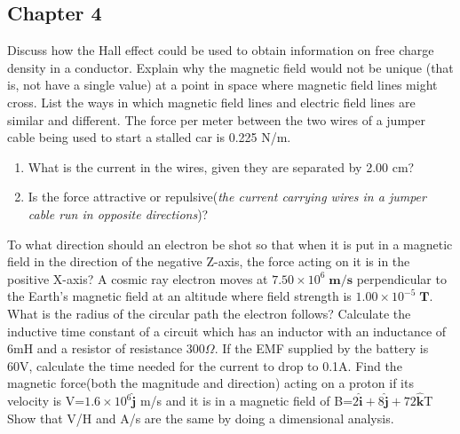 \documentclass[12pt,addpoints]{exam}
\begin{document}
\begin{questions}
		\subsection*{Chapter 4}
		\question Discuss how the Hall effect could be used to obtain information on free charge density in a conductor.\vspace{1.5in}
		\question Explain why the magnetic field would not be unique (that is, not have a single value) at a point in space where magnetic field lines might cross. \vspace{1.5in}
		\question List the ways in which magnetic field lines and electric field lines are similar and different.\vspace{1.5in}
		\question The force per meter between the two wires of a jumper cable being used to start a stalled car is 0.225 N/m. 
		\begin{enumerate}[label=(\roman*)]
			\item What is the current in the wires, given they are separated by 2.00 cm?\vspace{1.5in}
			\item Is the force attractive or repulsive(\textit{the current carrying wires in a jumper cable run in opposite directions})?\vspace{1.5in}
		\end{enumerate}
		\question To what direction should an electron be shot so that when it is put in a magnetic field in the direction of the negative Z-axis, the force acting on it is in the positive X-axis?\vspace{1.5in}
		\question A cosmic ray electron moves at $ 7.50 \times 10^6 \;\textbf{m/s}$ perpendicular to the Earth’s magnetic field at an altitude where field strength is $1.00 \times 10^{-5} \;\textbf{T} $. What is the radius of the circular path the electron follows?\vspace{1.5in}
		\question Calculate the inductive time constant of a circuit which has an inductor with an inductance of 6mH and a resistor of resistance 300$\varOmega$. If the EMF supplied by the battery is 60V, calculate the time needed for the current to drop to 0.1A. \vspace{1.5in}
		\question Find the magnetic force(both the magnitude and direction) acting on a proton if its velocity is V=$1.6\times10^6\hat{\boldsymbol{j}}$ m/s and it is in a magnetic field of B=$2\hat{\boldsymbol{i}} + 8\hat{\boldsymbol{j}} + 72\hat{\boldsymbol{k}}$T\vspace{1.5in}
		\question Show that V/H and A/s are the same by doing a dimensional analysis.\vspace{1.5in}

\end{questions}
\end{document}
